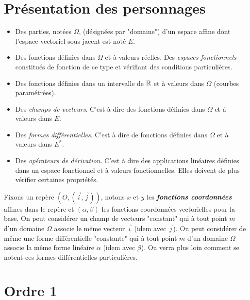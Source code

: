 

\section{Présentation des personnages}
\begin{itemize}
 \item Des parties, notées $\Omega$, (désignées par "domaine") d'un espace affine dont l'espace vectoriel sous-jacent est noté $E$.
 \item Des fonctions définies dans $\Omega$ et à valeurs réelles. Des \emph{espaces fonctionnels} constitués de fonction de ce type et vérifiant des conditions particulières.
\item Des fonctions définies dans un intervalle de $\mathbb{R}$ et à valeurs dans $\Omega$ (courbes paramétrées).
\item Des \emph{champs de vecteurs}. C'est à dire des fonctions définies dans $\Omega$ et à valeurs dans $E$.
\item Des \emph{formes différentielles}. C'est à dire de fonctions définies dans $\Omega$ et à valeurs dans $E^*$.
\item Des \emph{opérateurs de dérivation}. C'est à dire des applications linéaires définies dans un espace fonctionnel et à valeurs fonctionnelles. Elles doivent de plus vérifier certaines propriétés.
\end{itemize}
\begin{rem}
 Fixons un repère $(O,(\overrightarrow i , \overrightarrow j))$, notons $x$ et $y$ les \textbf{\emph{fonctions coordonnées}} affines dans le repère et $(\alpha , \beta)$ les fonctions coordonnées vectorielles pour la base.\newline
On peut considérer un champ de vecteurs "constant" qui à tout point $m$ d'un domaine $\Omega$ associe le même vecteur $\overrightarrow i$ (idem avec $\overrightarrow j$).\newline
On peut considérer de même une forme différentielle "constante" qui à tout point $m$ d'un domaine $\Omega$ associe la même forme linéaire $\alpha$ (idem avec $\beta$). On verra plus loin comment se notent ces formes différentielles particulières.
\end{rem}

\section{Ordre 1}
